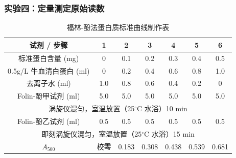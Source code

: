 \documentclass[10.5pt, a4paper]{ctexart}
\begin{document}
\subsubsection{实验四：定量测定原始读数}


\begin{table}[H]
\centering
\caption{福林-酚法蛋白质标准曲线制作表}
\begin{tabular}{ccccccc}
\toprule
\textbf{试剂 / 步骤} & \textbf{1} & \textbf{2} & \textbf{3} & \textbf{4} & \textbf{5} & \textbf{6} \\
\midrule
标准蛋白含量 (mg) & 0 & 0.1 & 0.2 & 0.3 & 0.4 & 0.5 \\
0.5g/L 牛血清白蛋白 (ml) & 0 & 0.2 & 0.4 & 0.6 & 0.8 & 1.0 \\
去离子水 (ml) & 1.0 & 0.8 & 0.6 & 0.4 & 0.2 & 0 \\
Folin-酚甲试剂 (ml) & 5.0 & 5.0 & 5.0 & 5.0 & 5.0 & 5.0 \\
\midrule
\multicolumn{7}{c}{涡旋仪混匀，室温放置（25$^{\circ}$C 水浴）10 min} \\
\midrule
Folin-酚乙试剂 (ml) & 0.5 & 0.5 & 0.5 & 0.5 & 0.5 & 0.5 \\
\midrule
\multicolumn{7}{c}{即刻涡旋仪混匀，室温放置（25$^{\circ}$C 水浴）15 min} \\
\midrule
$A_{500}$ & 校零 & 0.183 & 0.308 & 0.438 & 0.539 & 0.681 \\
\bottomrule
\end{tabular}
\label{tab:folin_std_appendix}
\end{table}
\end{document}
